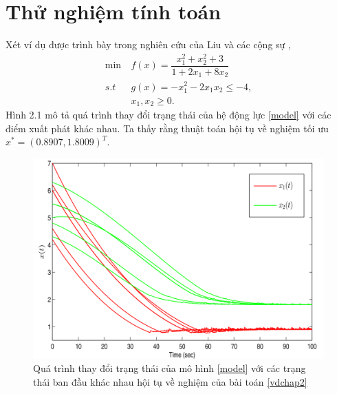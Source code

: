 \section{Thử nghiệm tính toán}
Xét ví dụ được trình bày trong nghiên cứu của Liu và các cộng sự \cite{Liu2021},
\begin{equation}
    \label{vdchap2}
    \begin{aligned}
        \min\ & f(x) = \dfrac{x_1^2 + x_2^2 +3}{1 + 2x_1 + 8x_2}\\
         s.t\ & g(x) = -x_1^2 - 2x_1x_2 \leq -4,\\
              & x_1, x_2 \geq 0.
    \end{aligned}
\end{equation}
Hình 2.1 mô tả quá trình thay đổi trạng thái của hệ động lực \eqref{model} với các điểm xuất phát khác nhau. Ta thấy rằng thuật toán hội tụ về nghiệm tối ưu $x^* = (0.8907, 1.8009)^T$.
\begin{figure}[H]
    \centering
    \includegraphics*[width=\textwidth]{Pictures/ex_chapter2.png}
    \caption{Quá trình thay đổi trạng thái của mô hình \eqref{model} với các trạng thái ban đầu khác nhau hội tụ về nghiệm của bài toán \eqref{vdchap2}}
\end{figure}
